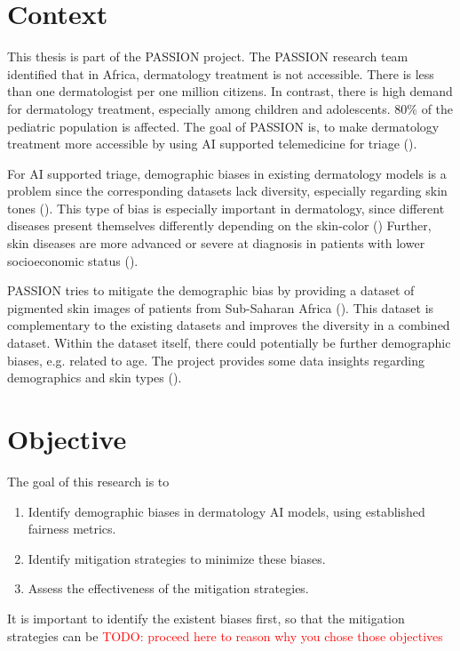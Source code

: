 \documentclass[a4paper,12pt,listof=numbered,toc=chapterentrywithdots]{scrreport}
\renewcommand{\todo}[1]{\textcolor{red}{TODO: #1}}
\begin{document}
		\section{Context}
			This thesis is part of the PASSION project. The PASSION research team identified that in Africa, dermatology treatment is not accessible. There is less than one dermatologist per one million citizens. In contrast, there is high demand for dermatology treatment, especially among children and adolescents. 80\% of the \gls{pediatric} population is affected. The goal of PASSION is, to make dermatology treatment more accessible by using AI supported telemedicine for triage (\cite{Gottfrois2024}).
		
			For AI supported triage, demographic biases in existing dermatology models is a problem since the corresponding datasets lack diversity, especially regarding skin tones (\cite{Gottfrois2024}). This type of bias is especially important in dermatology, since different diseases present themselves differently depending on the skin-color (\cite{Diaz2022}) Further, skin diseases are more advanced or severe at diagnosis in patients with lower socioeconomic status (\cite{BAD2021}).
			
			PASSION tries to mitigate the demographic bias by providing a dataset of pigmented skin images of patients from Sub-Saharan Africa (\cite{Gottfrois2024}). This dataset is complementary to the existing datasets and improves the diversity in a combined dataset. Within the dataset itself, there could potentially be further demographic biases, e.g. related to age. The project provides some data insights regarding demographics and skin types (\cite{Gottfrois2024}).
			 
		\section{Objective}
		The goal of this research is to
		\begin{enumerate}
			\item Identify demographic biases in dermatology AI models, using established fairness metrics.
			\item Identify mitigation strategies to minimize these biases.
			\item Assess the effectiveness of the mitigation strategies.
		\end{enumerate}
		It is important to identify the existent biases first, so that the mitigation strategies can be \todo{proceed here to reason why you chose those objectives}
		
\end{document}
